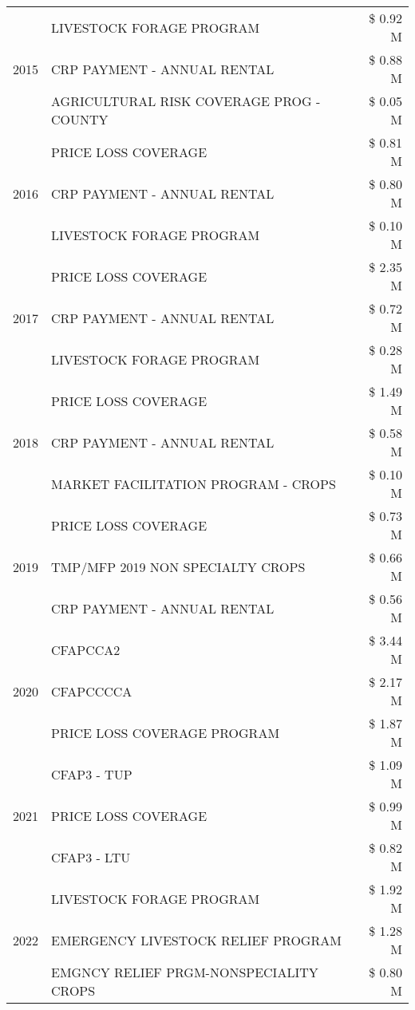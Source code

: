 \begin{tabular}{llr}
\cline{1-3}
\multirow[t]{3}{*}{2015} & LIVESTOCK FORAGE PROGRAM & \$ 0.92 M \\
 & CRP PAYMENT - ANNUAL RENTAL & \$ 0.88 M \\
 & AGRICULTURAL RISK COVERAGE PROG - COUNTY & \$ 0.05 M \\
\cline{1-3}
\multirow[t]{3}{*}{2016} & PRICE LOSS COVERAGE & \$ 0.81 M \\
 & CRP PAYMENT - ANNUAL RENTAL & \$ 0.80 M \\
 & LIVESTOCK FORAGE PROGRAM & \$ 0.10 M \\
\cline{1-3}
\multirow[t]{3}{*}{2017} & PRICE LOSS COVERAGE & \$ 2.35 M \\
 & CRP PAYMENT - ANNUAL RENTAL & \$ 0.72 M \\
 & LIVESTOCK FORAGE PROGRAM & \$ 0.28 M \\
\cline{1-3}
\multirow[t]{3}{*}{2018} & PRICE LOSS COVERAGE & \$ 1.49 M \\
 & CRP PAYMENT - ANNUAL RENTAL & \$ 0.58 M \\
 & MARKET FACILITATION PROGRAM - CROPS & \$ 0.10 M \\
\cline{1-3}
\multirow[t]{3}{*}{2019} & PRICE LOSS COVERAGE & \$ 0.73 M \\
 & TMP/MFP 2019 NON SPECIALTY CROPS & \$ 0.66 M \\
 & CRP PAYMENT - ANNUAL RENTAL & \$ 0.56 M \\
\cline{1-3}
\multirow[t]{3}{*}{2020} & CFAPCCA2 & \$ 3.44 M \\
 & CFAPCCCCA & \$ 2.17 M \\
 & PRICE LOSS COVERAGE PROGRAM & \$ 1.87 M \\
\cline{1-3}
\multirow[t]{3}{*}{2021} & CFAP3 - TUP & \$ 1.09 M \\
 & PRICE LOSS COVERAGE & \$ 0.99 M \\
 & CFAP3 - LTU & \$ 0.82 M \\
\cline{1-3}
\multirow[t]{3}{*}{2022} & LIVESTOCK FORAGE PROGRAM & \$ 1.92 M \\
 & EMERGENCY LIVESTOCK RELIEF PROGRAM & \$ 1.28 M \\
 & EMGNCY RELIEF PRGM-NONSPECIALITY CROPS & \$ 0.80 M \\
\cline{1-3}
\bottomrule
\end{tabular}
